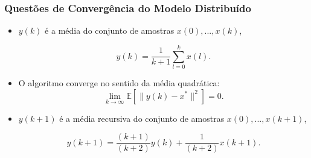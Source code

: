 \documentclass{beamer}
\begin{document}
\begin{frame}
	\frametitle{Questões de Convergência do Modelo Distribuído}

\vspace{-0.5cm}

\begin{itemize}
\item $y(k)$ \'e a m\'edia do conjunto de amostras $x(0),... , x(k)$, 

\begin{equation}
y(k) = \frac{1}{k+1} \sum_{l=0}^{k} x(l).
\end{equation}

\vspace{0.2cm}

\item O algoritmo converge no sentido da m\'edia quadr\'atica: 
%
\begin{equation}
\lim_{k\rightarrow \infty} \mathbb{E} [\parallel y(k)-x^* \parallel^2] = 0.
\end{equation}	

\vspace{0.2cm}

\item $y(k+1)$ é a média recursiva do conjunto de amostras $x(0),... , x(k+1)$,

\begin{equation}
y(k+1) = \frac{(k+1)}{(k+2)}y(k) + \frac{1}{(k+2)}x(k+1).
\end{equation}

\end{itemize}	
	
\end{frame}
\end{document}
